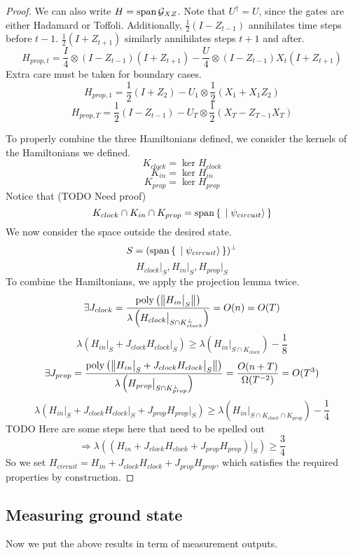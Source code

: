 \begin{proof}
We can also write $H=\operatorname*{\operatorname{span}}\mathcal{G}_{XZ}$. Note that $U^\dagger=U$, since the gates are either Hadamard or Toffoli. Additionally, $\frac{1}{2}(I-Z_{t-1})$ annihilates time steps before $t-1$. $\frac{1}{2}(I+Z_{t+1})$ similarly annihilates steps $t+1$ and after.
$$H_{prop,t}=\frac{I}{4}\otimes(I-Z_{t-1})(I+Z_{t+1})-\frac{U}{4}\otimes(I-Z_{t-1})X_t(I+Z_{t+1})$$
Extra care must be taken for boundary cases.
$$H_{prop,1}=\frac{1}{2}(I+Z_2)-U_1\otimes\frac{1}{2}(X_1+X_1Z_2)$$
$$H_{prop,T}=\frac{1}{2}(I-Z_{t-1})-U_T\otimes\frac{1}{2}(X_T-Z_{T-1}X_T)$$

To properly combine the three Hamiltonians defined, we consider the kernels of the Hamiltonians we defined.
$$K_{clock}=\ker H_{clock}$$
$$K_{in}=\ker H_{in}$$
$$K_{prop}=\ker H_{prop}$$
Notice that (TODO Need proof)
$$K_{clock}\cap K_{in}\cap K_{prop}=\operatorname*{\operatorname{span}}\set{\ket{\psi_{circuit}}}$$
We now consider the space outside the desired state.
$$S=(\operatorname*{\operatorname{span}}\set{\ket{\psi_{circuit}}})^\bot$$
$$H_{clock}\big|_S,H_{in}\big|_S,H_{prop}\big|_S$$
To combine the Hamiltonians, we apply the projection lemma twice.
$$\exists J_{clock}
=\frac{\operatorname*{\operatorname{poly}}\left(\left\lVert H_{in}\big|_S\right\rVert\right)}{\lambda\left(H_{clock}\big|_{S\cap K^\bot_{clock}}\right)}
=O(n)=O(T)$$
$$\lambda(H_{in}\big|_S+J_{clock}H_{clock}\big|_S)\geq
\lambda(H_{in}\big|_{S\cap K_{clock}})-\frac{1}{8}$$
$$\exists J_{prop}=\frac{\operatorname*{\operatorname{poly}}\left(\left\lVert H_{in}\big|_S+J_{clock}H_{clock}\big|_S\right\rVert\right)}{\lambda\left(H_{prop}\big|_{S\cap K^\bot_{prop}}\right)}
=\frac{O(n+T)}{\Omega(T^{-2})}=O(T^3)$$
$$\lambda(H_{in}\big|_S+J_{clock}H_{clock}\big|_S+J_{prop}H_{prop}\big|_S)\geq
\lambda(H_{in}\big|_{S\cap K_{clock}\cap K_{prop}})-\frac{1}{4}$$
TODO Here are some steps here that need to be spelled out
$$\Rightarrow\lambda((H_{in}+J_{clock}H_{clock}+J_{prop}H_{prop})\big|_S)\geq\frac{3}{4}$$
So we set $H_{circuit}=H_{in}+J_{clock}H_{clock}+J_{prop}H_{prop}$, which satisfies the required properties by construction.
\end{proof}

\subsection{Measuring ground state}

Now we put the above results in term of measurement outputs.

